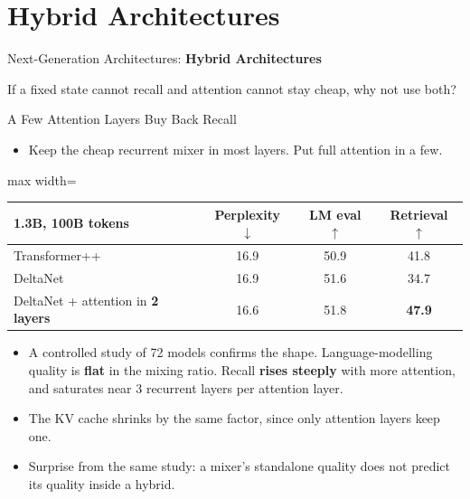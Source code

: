 \section{Hybrid Architectures}

\begin{frame}{}
    \LARGE Next-Generation Architectures: \textbf{Hybrid Architectures}

    \vspace{1em}
    \normalsize If a fixed state cannot recall and attention cannot stay cheap, why not use both?
\end{frame}

\begin{frame}{A Few Attention Layers Buy Back Recall}
    \begin{itemize}\itemsep0.4em
        \item Keep the cheap recurrent mixer in most layers. Put full attention in a few.
    \end{itemize}
    \begin{center}
    \small
    \begin{adjustbox}{max width=\linewidth}\begin{tabular}{lccc}
        \toprule
        \textbf{1.3B, 100B tokens} & \textbf{Perplexity} $\downarrow$ & \textbf{LM eval} $\uparrow$ & \textbf{Retrieval} $\uparrow$ \\
        \midrule
        Transformer++ & 16.9 & 50.9 & 41.8 \\
        DeltaNet & 16.9 & 51.6 & 34.7 \\
        \rowcolor{KAUSTcyan!12} DeltaNet + attention in \textbf{2 layers} & 16.6 & 51.8 & \textbf{47.9} \\
        \bottomrule
    \end{tabular}\end{adjustbox}
    \end{center}
    \begin{itemize}\itemsep0.4em
        \item A controlled study of 72 models confirms the shape. Language-modelling quality is \textbf{flat} in the mixing ratio. Recall \textbf{rises steeply} with more attention, and saturates near 3 recurrent layers per attention layer.
        \item The KV cache shrinks by the same factor, since only attention layers keep one.
        \item Surprise from the same study: a mixer's standalone quality does not predict its quality inside a hybrid.
    \end{itemize}
\end{frame}

